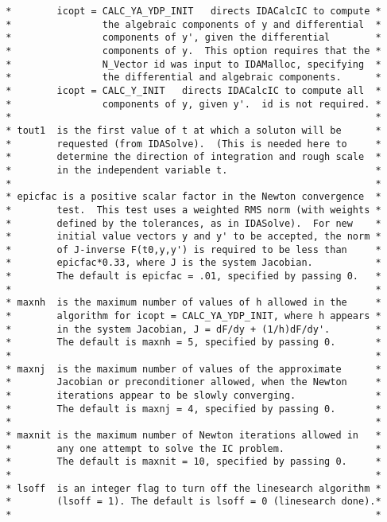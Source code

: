 \documentclass[11pt]{article}
\begin{document}
\begin{verbatim}
 *        icopt = CALC_YA_YDP_INIT   directs IDACalcIC to compute *
 *                the algebraic components of y and differential  *
 *                components of y', given the differential        *
 *                components of y.  This option requires that the *
 *                N_Vector id was input to IDAMalloc, specifying  *
 *                the differential and algebraic components.      *
 *        icopt = CALC_Y_INIT   directs IDACalcIC to compute all  *
 *                components of y, given y'.  id is not required. *
 *                                                                *
 * tout1  is the first value of t at which a soluton will be      *
 *        requested (from IDASolve).  (This is needed here to     *
 *        determine the direction of integration and rough scale  *
 *        in the independent variable t.                          *
 *                                                                *
 * epicfac is a positive scalar factor in the Newton convergence  *
 *        test.  This test uses a weighted RMS norm (with weights *
 *        defined by the tolerances, as in IDASolve).  For new    *
 *        initial value vectors y and y' to be accepted, the norm *
 *        of J-inverse F(t0,y,y') is required to be less than     *
 *        epicfac*0.33, where J is the system Jacobian.           *
 *        The default is epicfac = .01, specified by passing 0.   *
 *                                                                *
 * maxnh  is the maximum number of values of h allowed in the     *
 *        algorithm for icopt = CALC_YA_YDP_INIT, where h appears *
 *        in the system Jacobian, J = dF/dy + (1/h)dF/dy'.        *
 *        The default is maxnh = 5, specified by passing 0.       *
 *                                                                *
 * maxnj  is the maximum number of values of the approximate      *
 *        Jacobian or preconditioner allowed, when the Newton     *
 *        iterations appear to be slowly converging.              *
 *        The default is maxnj = 4, specified by passing 0.       *
 *                                                                *
 * maxnit is the maximum number of Newton iterations allowed in   *
 *        any one attempt to solve the IC problem.                *
 *        The default is maxnit = 10, specified by passing 0.     *
 *                                                                *
 * lsoff  is an integer flag to turn off the linesearch algorithm *
 *        (lsoff = 1). The default is lsoff = 0 (linesearch done).*
 *                                                                *

\end{verbatim}
\end{document}
